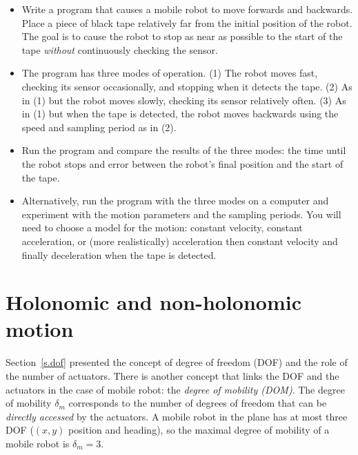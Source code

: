 \begin{framed}
\begin{itemize}
\item Write a program that causes a mobile robot to move forwards and backwards. Place a piece of black tape relatively far from the initial position of the robot. The goal is to cause the robot to stop as near as possible to the start of the tape \emph{without} continuously checking the sensor. 
\item The program has three modes of operation. (1) The robot moves fast, checking its sensor occasionally, and stopping when it detects the tape. (2) As in (1) but the robot moves slowly, checking its sensor relatively often. (3) As in (1) but when the tape is detected, the robot moves backwards using the speed and sampling period as in (2).
\item Run the program and compare the results of the three modes: the time until the robot stops and error between the robot's final position and the start of the tape.
\item Alternatively, run the program with the three modes on a computer and experiment with the motion parameters and the sampling periods. You will need to choose a model for the motion: constant velocity, constant acceleration, or (more realistically) acceleration then constant velocity and finally deceleration when the tape is detected.
\end{itemize}
\end{framed}



\section{Holonomic and non-holonomic motion}\label{s.holonomic}

Section~\ref{s.dof} presented the concept of degree of freedom (DOF) and the role of the number of actuators. There is another concept that links the DOF and the actuators in the case of mobile robot: the \emph{degree of mobility (DOM)}. The degree of mobility $\delta_m$ corresponds to the number of degrees of freedom that can be \emph{directly accessed} by the actuators. A mobile robot in the plane has at most three DOF ($(x,y)$ position and heading), so the maximal degree of mobility of a mobile robot is $\delta_m = 3$.

